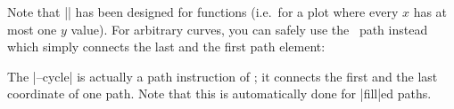 Note that |\closedcycle| has been designed for functions (i.e.\ for a plot where every $x$ has at most one $y$ value). For arbitrary curves, you can safely use the \tikzname\ path  instead which simply connects the last and the first path element:
\begin{codeexample}[]
\end{codeexample}

\begin{codeexample}[]
\end{codeexample}

\begin{codeexample}[]
\end{codeexample}
The |--cycle| is actually a path instruction of \cite{tikz}; it connects the first and the last coordinate of one path. Note that this is automatically done for |fill|ed paths.
